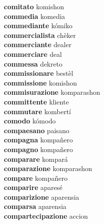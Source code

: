 \textbf{comitato } komishon \\
\textbf{commedia } komedia \\
\textbf{commediante } kómiko \\
\textbf{commercialista } chèker \\
\textbf{commerciante } dealer \\
\textbf{commerciare } deal \\
\textbf{commessa } dekreto \\
\textbf{commissionare } bestèl \\
\textbf{commissione } komishon \\
\textbf{commisurazione } komparashon \\
\textbf{committente } kliente \\
\textbf{commutare } kombertí \\
\textbf{comodo } kómodo \\
\textbf{compaesano } paisano \\
\textbf{compagna } kompañero \\
\textbf{compagno } kompañero \\
\textbf{comparare } kompará \\
\textbf{comparazione } komparashon \\
\textbf{compare } kompañero \\
\textbf{comparire } aparesé \\
\textbf{comparizione } aparensia \\
\textbf{comparsa } aparensia \\
\textbf{compartecipazione } accion \\
